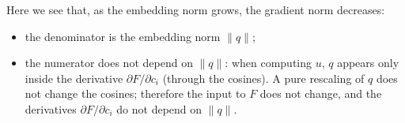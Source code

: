 Here we see that, as the embedding norm grows, the gradient norm decreases:
\begin{itemize}
  \item the denominator is the embedding norm $\|q\|$;
  \item the numerator does not depend on $\|q\|$: when computing $u$, $q$ appears only inside the derivative $\partial F/\partial c_i$ (through the cosines). A pure rescaling of $q$ does not change the cosines; therefore the input to $F$ does not change, and the derivatives $\partial F/\partial c_i$ do not depend on $\|q\|$.
\end{itemize}
